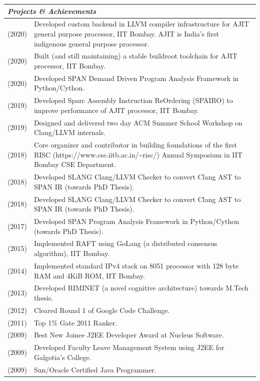 \documentclass[a4paper,12pt]{article}
\newcommand{\Heading}[1]{\textbf{\itshape\normalsize #1}}
\begin{document}
\begin{flushleft}
\vspace{1em}
\begin{tabular}{ m{} m{}}
\multicolumn{2}{l}{\Heading{Projects \& Achievements}} \\
    \hline
    \hline
\rule[13pt]{0ex}{0ex}(2020) & Developed custom backend in LLVM compiler infrastructure
for AJIT general purpose processor, IIT Bombay. AJIT is India's first indigenous general purpose processor. \\
\rule[13pt]{0ex}{0ex}(2020) & Built (and still maintaining) a stable buildroot toolchain
for AJIT processor, IIT Bombay. \\
\rule[13pt]{0ex}{0ex}(2020) & Developed SPAN Demand Driven Program Analysis Framework in Python/Cython. \\
\rule[13pt]{0ex}{0ex}(2019) & Developed Sparc Assembly Instruction ReOrdering (SPAIRO)
to improve performance of AJIT processor, IIT Bombay. \\
\rule[13pt]{0ex}{0ex}(2019) & Designed and delivered two day ACM Summer School Workshop on Clang/LLVM internals.\\
\rule[13pt]{0ex}{0ex}(2018) & Core organizer and contributor in building foundations of the first RISC (https://www.cse.iitb.ac.in/\textasciitilde{}risc/) Annual Symposium in IIT Bombay CSE Department. \\
\rule[13pt]{0ex}{0ex}(2018) & Developed SLANG Clang/LLVM Checker to convert Clang AST to SPAN IR (towards PhD Thesis). \\
\rule[13pt]{0ex}{0ex}(2018) & Developed SLANG Clang/LLVM Checker to convert Clang AST to SPAN IR (towards PhD Thesis). \\
\rule[13pt]{0ex}{0ex}(2017) & Developed SPAN Program Analysis Framework in Python/Cython (towards PhD Thesis). \\
\rule[13pt]{0ex}{0ex}(2015) & Implemented RAFT using GoLang (a distributed consensus algorithm), IIT Bombay. \\
\rule[13pt]{0ex}{0ex}(2014) & Implemented standard IPv4 stack on 8051 processor with 128 byte RAM and 4KiB ROM, IIT Bombay. \\
\rule[13pt]{0ex}{0ex}(2013) & Developed RIMINET (a novel cognitive architecture) towards M.Tech thesis. \\
\rule[13pt]{0ex}{0ex}(2012) & Cleared Round 1 of Google Code Challenge. \\
\rule[13pt]{0ex}{0ex}(2011) & Top 1\% Gate 2011 Ranker. \\
\rule[13pt]{0ex}{0ex}(2009) & Best New Joinee J2EE Developer Award at Nucleus Software. \\
\rule[13pt]{0ex}{0ex}(2009) & Developed Faculty Leave Management System using J2EE for Galgotia's College.\\
\rule[13pt]{0ex}{0ex}(2009) & Sun/Oracle Certified Java Programmer. \\
\end{tabular}


\end{flushleft}
\end{document}
